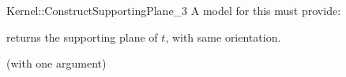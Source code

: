 \begin{ccRefFunctionObjectConcept}{Kernel::ConstructSupportingPlane_3}
A model for this must provide:


       {returns the supporting plane of $t$, with same orientation.}

\ccRefines
{} (with one argument)

\ccSeeAlso
{} \\

\end{ccRefFunctionObjectConcept}
